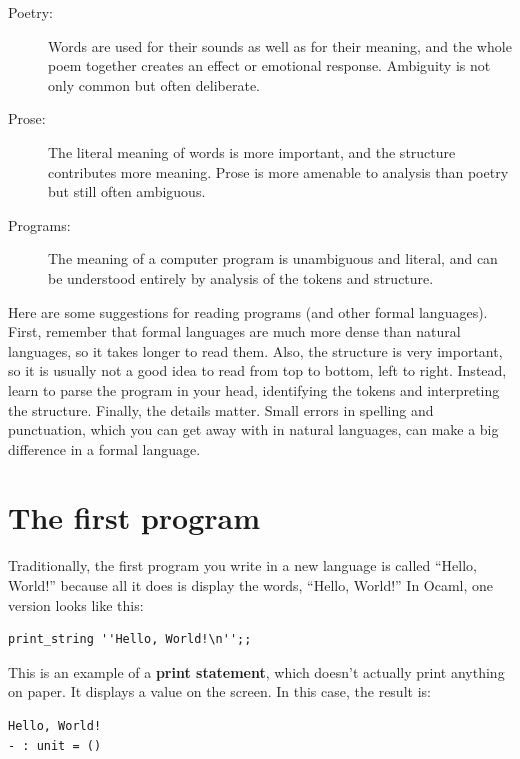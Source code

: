 \documentclass[10pt]{book}
\begin{document}
\begin{description}

\item[Poetry:] Words are used for their sounds as well as for their meaning, and the whole poem 
together creates an effect or emotional response.  Ambiguity is not only common but often deliberate.

\item[Prose:] The literal meaning of words is more important, and the structure contributes more 
meaning.  Prose is more amenable to analysis than poetry but still often ambiguous.

\item[Programs:] The meaning of a computer program is unambiguous and literal, and can be understood 
entirely by analysis of the tokens and structure.

\end{description}

Here are some suggestions for reading programs (and other formal languages).  First, remember that 
formal languages are much more dense than natural languages, so it takes longer to read them.  Also, 
the structure is very important, so it is usually not a good idea to read from top to bottom, left 
to right.  Instead, learn to parse the program in your head, identifying the tokens and interpreting 
the structure.  Finally, the details matter.  Small errors in spelling and punctuation, which you can 
get away with in natural languages, can make a big difference in a formal language.

\section{The first program}
\label{hello}


Traditionally, the first program you write in a new language is called ``Hello, World!'' 
because all it does is display the words, ``Hello, World!''  In Ocaml, one version looks 
like this:

\beforeverb
\begin{verbatim}
print_string ''Hello, World!\n'';;
\end{verbatim}
\afterverb

This is an example of a {\bf print statement}, which doesn't actually print anything on paper. 
It displays a value on the screen.  In this case, the result is:

\beforeverb
\begin{verbatim}
Hello, World!
- : unit = ()
\end{verbatim}
\afterverb
\end{document}

